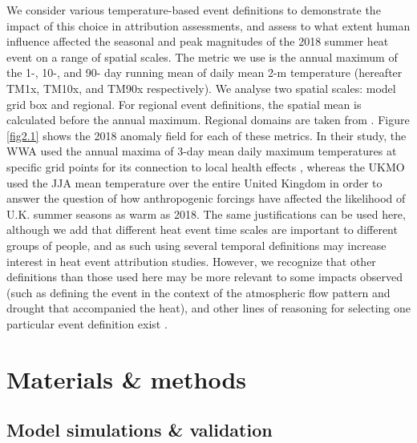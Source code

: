   We consider various temperature-based event definitions to demonstrate the impact of this choice in attribution assessments, and assess to what extent human influence affected the seasonal and peak magnitudes of the 2018 summer heat event on a range of spatial scales. The metric we use is the annual maximum of the 1-, 10-, and 90- day running mean of daily mean 2-m temperature (hereafter TM1x, TM10x, and TM90x respectively). We analyse two spatial scales: model grid box and regional. For regional event definitions, the spatial mean is calculated before the annual maximum. Regional domains are taken from \citet{christensen_summary_2007}. Figure \ref{fig2.1} shows the 2018 anomaly field for each of these metrics. In their study, the WWA used the annual maxima of 3-day mean daily maximum temperatures at specific grid points for its connection to local health effects \citep{dippoliti_impact_2010}, whereas the UKMO used the JJA mean temperature over the entire United Kingdom in order to answer the question of how anthropogenic forcings have affected the likelihood of U.K. summer seasons as warm as 2018. The same justifications can be used here, although we add that different heat event time scales are important to different groups of people, and as such using several temporal definitions may increase interest in heat event attribution studies. However, we recognize that other definitions than those used here may be more relevant to some impacts observed (such as defining the event in the context of the atmospheric flow pattern and drought that accompanied the heat), and other lines of reasoning for selecting one particular event definition exist \citep{cattiaux_defining_2018}.

\section{Materials \& methods}

  \subsection*{Model simulations \& validation}

